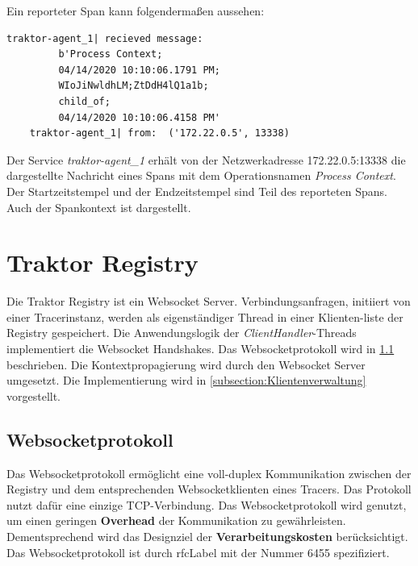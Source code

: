 Ein reporteter Span kann folgendermaßen aussehen:

\begin{minipage}[]{\textwidth}
	\begin{lstlisting}[frame=trBL]
	traktor-agent_1| recieved message: 
		 b'Process Context;
		 04/14/2020 10:10:06.1791 PM;
		 WIoJiNwldhLM;ZtDdH4lQ1a1b;
		 child_of;
		 04/14/2020 10:10:06.4158 PM'
	traktor-agent_1| from:  ('172.22.0.5', 13338)
	\end{lstlisting}
	\label{listing:Reporteter-Span}
\end{minipage} 

Der Service \emph{traktor-agent\_1} erhält von der Netzwerkadresse 172.22.0.5:13338 die dargestellte Nachricht eines Spans mit dem Operationsnamen \emph{Process Context}. Der Startzeitstempel und der Endzeitstempel sind Teil des reporteten Spans. Auch der Spankontext ist dargestellt.

\section{Traktor Registry}
\label{section:Traktor Registry}

Die Traktor Registry ist ein Websocket Server. Verbindungsanfragen, initiiert von einer Tracerinstanz, werden als eigenständiger Thread in einer Klienten-liste der Registry gespeichert. Die Anwendungslogik der \emph{ClientHandler}-Threads implementiert die Websocket Handshakes. Das Websocketprotokoll wird in \cref{subsection:Websocketprotokoll} beschrieben. Die Kontextpropagierung wird durch den Websocket Server umgesetzt. Die Implementierung wird in \cref{subsection:Klientenverwaltung} vorgestellt.

\subsection{Websocketprotokoll}
\label{subsection:Websocketprotokoll}

Das Websocketprotokoll ermöglicht eine voll-duplex Kommunikation zwischen der Registry und dem entsprechenden Websocketklienten eines Tracers. Das Protokoll nutzt dafür eine einzige TCP-Verbindung. Das Websocketprotokoll wird genutzt, um einen geringen \textbf{Overhead} der Kommunikation zu gewährleisten. Dementsprechend wird das Designziel der \textbf{Verarbeitungskosten} berücksichtigt. Das Websocketprotokoll ist durch \gls{rfcLabel} mit der Nummer 6455 spezifiziert.

